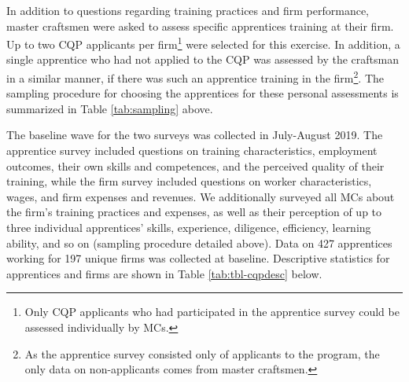 \documentclass[
  11pt,
a4paper
]{report}
\begin{document}
\justifying

\noindent In addition to questions regarding training practices and firm performance, master craftsmen were asked to assess specific apprentices training at their firm. Up to two CQP applicants per firm\footnote{Only CQP applicants who had participated in the apprentice survey could be assessed individually by MCs.} were selected for this exercise. In addition, a single apprentice who had not applied to the CQP was assessed by the craftsman in a similar manner, if there was such an apprentice training in the firm\footnote{As the apprentice survey consisted only of applicants to the program, the only data on non-applicants comes from master craftsmen.}. The sampling procedure for choosing the apprentices for these personal assessments is summarized in Table \ref{tab:sampling} above.

The baseline wave for the two surveys was collected in July-August 2019. The apprentice survey included questions on training characteristics, employment outcomes, their own skills and competences, and the perceived quality of their training, while the firm survey included questions on worker characteristics, wages, and firm expenses and revenues. We additionally surveyed all MCs about the firm's training practices and expenses, as well as their perception of up to three individual apprentices' skills, experience, diligence, efficiency, learning ability, and so on (sampling procedure detailed above). Data on 427 apprentices working for 197 unique firms was collected at baseline. Descriptive statistics for apprentices and firms are shown in Table \ref{tab:tbl-cqpdesc} below.
\end{document}
